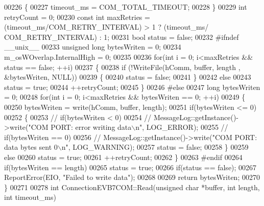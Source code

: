 \begin{DoxyCode}
00226     \{
00227         timeout\_ms = COM_TOTAL_TIMEOUT;
00228     \}
00229     \textcolor{keywordtype}{int} retryCount = 0;
00230     \textcolor{keyword}{const} \textcolor{keywordtype}{int} maxRetries = (timeout\_ms/COM_RETRY_INTERVAL) > 1 ? (timeout\_ms/
      COM_RETRY_INTERVAL) : 1;
00231     \textcolor{keywordtype}{bool} status = \textcolor{keyword}{false};
00232 \textcolor{preprocessor}{#ifndef \_\_unix\_\_}
00233     \textcolor{keywordtype}{unsigned} \textcolor{keywordtype}{long} bytesWriten = 0;
00234     m_osWOverlap.InternalHigh = 0;
00235 
00236     \textcolor{keywordflow}{for}(\textcolor{keywordtype}{int} i = 0; i<maxRetries && status == \textcolor{keyword}{false}; ++i)
00237     \{
00238         \textcolor{keywordflow}{if} (!WriteFile(hComm, buffer, length , &bytesWriten, NULL))
00239         \{
00240             status = \textcolor{keyword}{false};
00241         \}
00242         \textcolor{keywordflow}{else}
00243             status = \textcolor{keyword}{true};
00244         ++retryCount;
00245     \}
00246 \textcolor{preprocessor}{#else}
00247     \textcolor{keywordtype}{long} bytesWriten = 0;
00248     \textcolor{keywordflow}{for}(\textcolor{keywordtype}{int} i = 0; i<maxRetries && bytesWriten == 0; ++i)
00249     \{
00250         bytesWriten = write(hComm, buffer, length);
00251         \textcolor{keywordflow}{if}(bytesWriten <= 0)
00252         \{
00253 \textcolor{comment}{//            if(bytesWriten < 0)}
00254 \textcolor{comment}{//                MessageLog::getInstance()->write("COM PORT: error writing data\(\backslash\)n", LOG\_ERROR);}
00255 \textcolor{comment}{//            if(bytesWriten == 0)}
00256 \textcolor{comment}{//                MessageLog::getInstance()->write("COM PORT: data bytes sent 0\(\backslash\)n", LOG\_WARNING);}
00257             status = \textcolor{keyword}{false};
00258         \}
00259         \textcolor{keywordflow}{else}
00260             status = \textcolor{keyword}{true};
00261         ++retryCount;
00262     \}
00263 \textcolor{preprocessor}{#endif}
00264     \textcolor{keywordflow}{if}(bytesWriten == length)
00265         status = \textcolor{keyword}{true};
00266     \textcolor{keywordflow}{if}(status == \textcolor{keyword}{false});
00267         ReportError(EIO, \textcolor{stringliteral}{"Failed to write data"});
00268 
00269     \textcolor{keywordflow}{return} bytesWriten;
00270 \}
00271 
00278 \textcolor{keywordtype}{int} ConnectionEVB7COM::Read(\textcolor{keywordtype}{unsigned} \textcolor{keywordtype}{char} *buffer, \textcolor{keywordtype}{int} length, \textcolor{keywordtype}{int} timeout_ms)

\end{DoxyCode}
